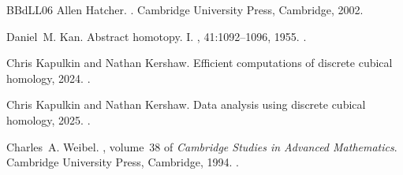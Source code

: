 \documentclass[12pt]{amsart}
\theoremstyle{plain}
\numberwithin{lemma}{\DefaultNumberTheoremWithin}
\numberwithin{claim}{\DefaultNumberTheoremWithin}
\numberwithin{theorem}{\DefaultNumberTheoremWithin}
\numberwithin{corollary}{\DefaultNumberTheoremWithin}
\numberwithin{proposition}{\DefaultNumberTheoremWithin}
\numberwithin{conjecture}{\DefaultNumberTheoremWithin}
\theoremstyle{definition}
\theoremstyle{definition}
\numberwithin{question}{\DefaultNumberTheoremWithin}
\theoremstyle{definition}
\numberwithin{problem}{\DefaultNumberTheoremWithin}
\theoremstyle{remark}
\numberwithin{remark}{\DefaultNumberTheoremWithin}
\theoremstyle{remark}
\numberwithin{example}{\DefaultNumberTheoremWithin}
\begin{document}
\begin{thebibliography}{BBdLL06}
Allen Hatcher.
.
\newblock Cambridge University Press, Cambridge, 2002.

Daniel~M. Kan.
\newblock Abstract homotopy. {I}.
, 41:1092--1096, 1955.
\newblock \href {https://doi.org/10.1073/pnas.41.12.1092}
  {}.

Chris Kapulkin and Nathan Kershaw.
\newblock Efficient computations of discrete cubical homology, 2024.
\newblock \href {https://arxiv.org/abs/2410.09939} {}.

Chris Kapulkin and Nathan Kershaw.
\newblock Data analysis using discrete cubical homology, 2025.
\newblock \href {https://arxiv.org/abs/2506.15020} {}.

Charles~A. Weibel.
, volume~38 of {\em
  Cambridge Studies in Advanced Mathematics}.
\newblock Cambridge University Press, Cambridge, 1994.
\newblock \href {https://doi.org/10.1017/CBO9781139644136}
  {}.

\end{thebibliography}
\end{document}
